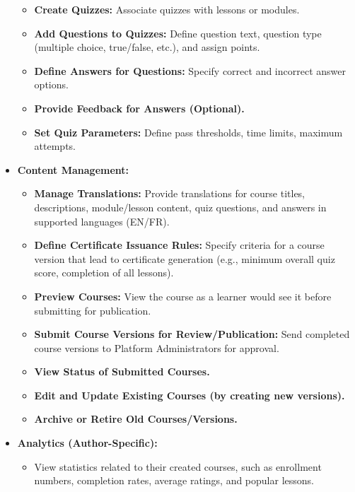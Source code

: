\documentclass[12pt, a4paper]{report} %
\begin{document}
\begin{itemize}
\begin{itemize}
            \item \textbf{Create Quizzes:} Associate quizzes with lessons or modules.
            \item \textbf{Add Questions to Quizzes:} Define question text, question type (multiple choice, true/false, etc.), and assign points.
            \item \textbf{Define Answers for Questions:} Specify correct and incorrect answer options.
            \item \textbf{Provide Feedback for Answers (Optional).}
            \item \textbf{Set Quiz Parameters:} Define pass thresholds, time limits, maximum attempts.
        \end{itemize}
    \item \textbf{Content Management:}
        \begin{itemize}
            \item \textbf{Manage Translations:} Provide translations for course titles, descriptions, module/lesson content, quiz questions, and answers in supported languages (EN/FR).
            \item \textbf{Define Certificate Issuance Rules:} Specify criteria for a course version that lead to certificate generation (e.g., minimum overall quiz score, completion of all lessons).
            \item \textbf{Preview Courses:} View the course as a learner would see it before submitting for publication.
            \item \textbf{Submit Course Versions for Review/Publication:} Send completed course versions to Platform Administrators for approval.
            \item \textbf{View Status of Submitted Courses.}
            \item \textbf{Edit and Update Existing Courses (by creating new versions).}
            \item \textbf{Archive or Retire Old Courses/Versions.}
        \end{itemize}
    \item \textbf{Analytics (Author-Specific):}
        \begin{itemize}
            \item View statistics related to their created courses, such as enrollment numbers, completion rates, average ratings, and popular lessons.
        \end{itemize}
  \end{itemize}
\end{document}
